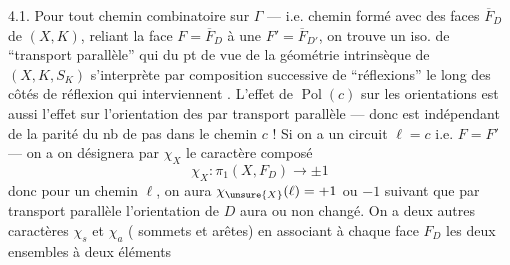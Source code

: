 4.1. Pour tout  chemin  combinatoire sur $\Gamma$ --- i.e. chemin formé avec des faces $\overline F_D$ de $(X,K)$, reliant la face $F=\overline F_D$ à une $F'=\overline F_{D'}$, on trouve un iso. de ``transport parallèle''
qui du pt de vue de la géométrie intrinsèque de $(X,K,S_K)$ s'interprète par composition successive de ``réflexions'' le long des côtés de réflexion qui interviennent .
L'effet de $\operatorname{Pol}(c)$ sur les orientations
est aussi l'effet sur l'orientation des  par transport parallèle --- donc est indépendant de la parité du nb de pas dans le chemin $c$ ! Si on a un circuit \deleted{$\unsure{\ell}$} $\ell=c$ i.e. $F=F'$ --- on a
on désignera par $\chi_X$ le caractère composé
\[\chi_X:\pi_1(X,F_D)\longrightarrow\pm1\]
donc pour un chemin $\ell$, on aura $\chi_{\unsure{X}}(\ell)=+1$ ou $-1$ suivant que par transport parallèle l'orientation de $D$ aura ou non changé. 
On a deux autres caractères $\chi_s$ et $\chi_a$ ( sommets et arêtes) en associant à chaque face $F_D$ les deux ensembles à deux éléments

